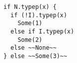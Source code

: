 \begin{lstlisting}[style=scalaioScala]
if N.typep(x) {
  if (!I).typep(x)
    Some(1)
  else if I.typep(x)
    Some(2)
  else ~~None~~
} else ~~Some(3)~~
\end{lstlisting}
